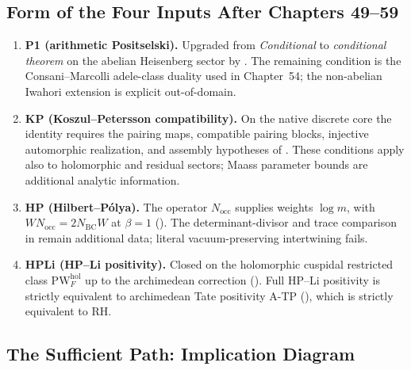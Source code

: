 \subsection{Form of the Four Inputs After Chapters 49--59}
\label{v4-arith:w5-synth:per-input}

\begin{enumerate}
\item \textbf{P1 (arithmetic Positselski).} Upgraded from
\emph{Conditional} to \emph{conditional theorem} on the abelian
Heisenberg sector by .
The remaining condition is the Consani--Marcolli adele-class
duality used in Chapter~54; the non-abelian Iwahori extension is
explicit out-of-domain.
\item \textbf{KP (Koszul--Petersson compatibility).}
On the native discrete core the identity requires the pairing maps,
compatible pairing blocks, injective automorphic realization,
and assembly hypotheses of
. These conditions apply
also to holomorphic and residual sectors; Maass parameter bounds are
additional analytic information.
\item \textbf{HP (Hilbert--P\'olya).}
The operator \(N_{\mathrm{occ}}\) supplies weights \(\log m\), with
\(WN_{\mathrm{occ}}=2N_{\mathrm{BC}}W\) at \(\beta=1\)
(). The determinant-divisor
and trace comparison in 
remain additional data; literal vacuum-preserving intertwining fails.

\item \textbf{HPLi (HP--Li positivity).} Closed on the holomorphic
cuspidal restricted class \(\mathrm{PW}^{\mathrm{hol}}_{F}\) up to
the archimedean correction
(). Full HP--Li positivity is
strictly equivalent to archimedean Tate positivity A-TP
(), which is
strictly equivalent to RH.
\end{enumerate}

\subsection{The Sufficient Path: Implication Diagram}
\label{v4-arith:w5-synth:implication-diagram}

